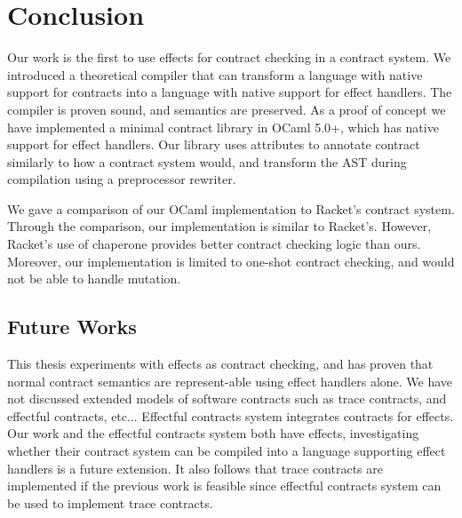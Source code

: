 \chapter{Conclusion}
\label{chap:final}

Our work is the first to use effects for contract checking in a contract system. We introduced a theoretical compiler that can transform a language with native support for contracts into a language with native support for effect handlers. The compiler is proven sound, and semantics are preserved. As a proof of concept we have implemented a minimal contract library in OCaml 5.0+, which has native support for effect handlers. Our library uses attributes to annotate contract similarly to how a contract system would, and transform the AST during compilation using a preprocessor rewriter.

We gave a comparison of our OCaml implementation to Racket's contract system. Through the comparison, our implementation is similar to Racket's. However, Racket's use of chaperone provides better contract checking logic than ours. Moreover, our implementation is limited to one-shot contract checking, and would not be able to handle mutation.

\section{Future Works}

This thesis experiments with effects as contract checking, and has proven that normal contract semantics are represent-able using effect handlers alone. We have not discussed extended models of software contracts such as trace contracts, and effectful contracts, etc... Effectful contracts system integrates contracts for effects. Our work and the effectful contracts system both have effects, investigating whether their contract system can be compiled into a language supporting effect handlers is a future extension. It also follows that trace contracts are implemented if the previous work is feasible since effectful contracts system can be used to implement trace contracts.
